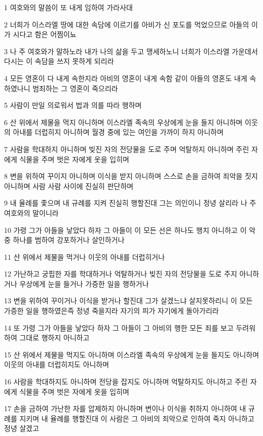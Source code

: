 \par 1 여호와의 말씀이 또 내게 임하여 가라사대
\par 2 너희가 이스라엘 땅에 대한 속담에 이르기를 아비가 신 포도를 먹었으므로 아들의 이가 시다고 함은 어찜이뇨
\par 3 나 주 여호와가 말하노라 내가 나의 삶을 두고 맹세하노니 너희가 이스라엘 가운데서 다시는 이 속담을 쓰지 못하게 되리라
\par 4 모든 영혼이 다 내게 속한지라 아비의 영혼이 내게 속함 같이 아들의 영혼도 내게 속하였나니 범죄하는 그 영혼이 죽으리라
\par 5 사람이 만일 의로워서 법과 의를 따라 행하며
\par 6 산 위에서 제물을 먹지 아니하며 이스라엘 족속의 우상에게 눈을 들지 아니하며 이웃의 아내를 더럽히지 아니하며 월경 중에 있는 여인을 가까이 하지 아니하며
\par 7 사람을 학대하지 아니하며 빚진 자의 전당물을 도로 주며 억탈하지 아니하며 주린 자에게 식물을 주며 벗은 자에게 옷을 입히며
\par 8 변을 위하여 꾸이지 아니하며 이식을 받지 아니하며 스스로 손을 금하여 죄악을 짓지 아니하며 사람 사람 사이에 진실히 판단하며
\par 9 내 율례를 좇으며 내 규례를 지켜 진실히 행할진대 그는 의인이니 정녕 살리라 나 주 여호와의 말이니라
\par 10 가령 그가 아들을 낳았다 하자 그 아들이 이 모든 선은 하나도 행치 아니하고 이 악중 하나를 범하여 강포하거나 살인하거나
\par 11 산 위에서 제물을 먹거나 이웃의 아내를 더럽히거나
\par 12 가난하고 궁핍한 자를 학대하거나 억탈하거나 빚진 자의 전당물을 도로 주지 아니하거나 우상에게 눈을 들거나 가증한 일을 행하거나
\par 13 변을 위하여 꾸이거나 이식을 받거나 할진대 그가 살겠느냐 살지못하리니 이 모든 가증한 일을 행하였은즉 정녕 죽을지라 자기의 피가 자기에게 돌아가리라
\par 14 또 가령 그가 아들을 낳았다 하자 그 아들이 그 아비의 행한 모든 죄를 보고 두려워하여 그대로 행하지 아니하고
\par 15 산 위에서 제물을 먹지도 아니하며 이스라엘 족속의 우상에게 눈을 들지도 아니하며 이웃의 아내를 더럽히지도 아니하며
\par 16 사람을 학대하지도 아니하며 전당을 잡지도 아니하며 억탈하지도 아니하고 주린 자에게 식물을 주며 벗은 자에게 옷을 입히며
\par 17 손을 금하여 가난한 자를 압제하지 아니하며 변이나 이식을 취하지 아니하여 내 규례를 지키며 내 율례를 행할진대 이 사람은 그 아비의 죄악으로 인하여 죽지 아니하고 정녕 살겠고
